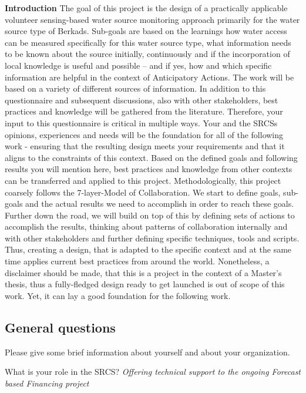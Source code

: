 \textbf{Introduction}\newline
The goal of this project is the design of a practically applicable volunteer sensing-based water source monitoring approach primarily for the water source type of Berkads.
Sub-goals are based on the learnings how water access can be measured specifically for this water source type, what information needs to be known about the source initially, continuously and if the incorporation of local knowledge is useful and possible -- and if yes, how and which specific information are helpful in the context of Anticipatory Actions.\newline
The work will be based on a variety of different sources of information. In addition to this questionnaire and subsequent discussions, also with other stakeholders, best practices and knowledge will be gathered from the literature. Therefore, your input to this questionnaire is critical in multiple ways. Your and the SRCSs opinions, experiences and needs will be the foundation for all of the following work - ensuring that the resulting design meets your requirements and that it aligns to the constraints of this context. Based on the defined goals and following results you will mention here, best practices and knowledge from other contexts can be transferred and applied to this project.\newline
Methodologically, this project coarsely follows the 7-layer-Model of Collaboration. We start to define goals, sub-goals and the actual results we need to accomplish in order to reach these goals. Further down the road, we will build on top of this by defining sets of actions to accomplish the results, thinking about patterns of collaboration internally and with other stakeholders and further defining specific techniques, tools and scripts. Thus, creating a design, that is adapted to the specific context and at the same time applies current best practices from around the world. Nonetheless, a disclaimer should be made, that this is a project in the context of a Master's thesis, thus a fully-fledged design ready to get launched is out of scope of this work. Yet, it can lay a good foundation for the following work.

\subsection*{General questions}
Please give some brief information about yourself and about your organization.

What is your role in the SRCS?\newline
\textit{Offering technical support to the ongoing Forecast based Financing project}

